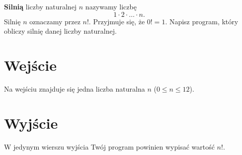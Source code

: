 \documentclass{spiral-kurs}
\begin{document}
\makeheader
%
    \textbf{Silnią} liczby naturalnej $n$ nazywamy liczbę
    $$1 \cdot 2 \cdot \ldots \cdot n.$$
    Silnię $n$ oznaczamy przez $n!$.
    Przyjmuje się, że $0!=1$.
    Napisz program, który obliczy silnię danej liczby naturalnej.

    \section{Wejście}
    Na wejściu znajduje się jedna liczba naturalna $n$ ($0 \le n \le 12$).

    \section{Wyjście}
    W jedynym wierszu wyjścia Twój program powinien wypisać wartość $n!$.



  
\end{document}
